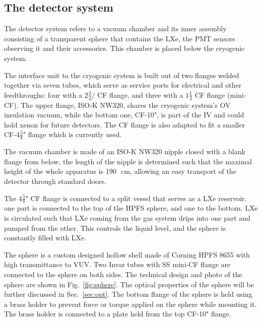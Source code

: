 \subsection{The detector system}
\label{subsec:det}
 
The detector system refers to a vacuum chamber and its inner assembly consisting of a transparent sphere that 
contains the LXe, the PMT sensors observing it and their accessories. This chamber is placed below the cryogenic system. 


The interface unit to the cryogenic system is built out of two flanges welded together via seven tubes, which serve as service ports for electrical and other feedthroughs: four 
with a $2 \frac{3}{4}/$ CF flange, and three with a $1\frac{1}{3}$ CF flange (mini-CF). 
The upper flange, ISO-K NW320, shares the cryogenic system's OV insulation vacuum, while the bottom one, CF-10", is part of the IV and could hold xenon for future detectors. 
The CF flange is also adapted to fit a smaller CF-$4\frac{5}{8}$" flange which is currently used.

The vacuum chamber is made of an ISO-K NW320 nipple closed with a blank flange from below, 
the length of the nipple is determined such that the maximal height of the whole 
apparatus is 190~\,cm, allowing an easy transport of the detector through standard doors.
 
The $4\frac{5}{8}$" CF flange is connected to a split vessel that serves as a LXe reservoir. one part is connected 
to the top of the HPFS sphere, and one to the bottom. LXe is circulated such that LXe coming from the gas system drips into one part and pumped from the other. This controls the liquid level, and the sphere is constantly filled with LXe. 


The sphere is a custom designed hollow shell made of Corning HPFS 8655 with high transmittance to VUV. Two Invar tubes with SS mini-CF flange are connected to the sphere on both sides. The technical design and photo of the sphere are shown in Fig.~\ref{fig:sphere}. The optical properties of the sphere will be further discussed in Sec.~\ref{sec:opt}. 
The bottom flange of the sphere is held using a brass holder to prevent 
force or torque applied on the sphere while mounting it. The 
brass holder is connected to a plate held from the top CF-10" flange. 


